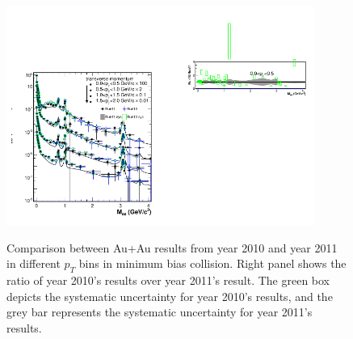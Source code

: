 \begin{figure}
\begin{centering}
\includegraphics[width=0.45\textwidth]{fig/3.Analysis/Run11/pT_Yield_cocktail_Run11vsRun10}\includegraphics[width=0.45\textwidth]{fig/3.Analysis/Run11/pT_ratio_Run11vsRun10}
\par\end{centering}

\protect\caption{Comparison between Au+Au results from year 2010 and year 2011 in different
$p_{T}$ bins in minimum bias collision. Right panel shows the ratio
of year 2010's results over year 2011's result. The green box depicts
the systematic uncertainty for year 2010's results, and the grey bar
represents the systematic uncertainty for year 2011's results.}


\label{fig: Run10vsRun11 pT}

\end{figure}



